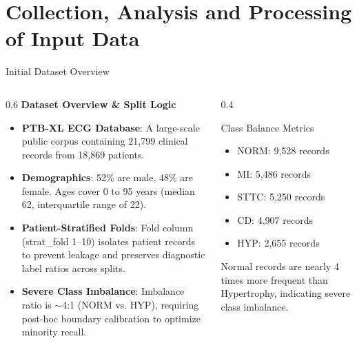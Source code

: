 \documentclass[11pt,aspectratio=169]{beamer}
\begin{document}
\section{Collection, Analysis and Processing of Input Data}
\begin{frame}{Initial Dataset Overview}
    \begin{columns}[T]
        \begin{column}{0.6\textwidth}
            \textbf{Dataset Overview \& Split Logic}
            \begin{itemize}
                \item \textbf{PTB-XL ECG Database}: A large-scale public corpus containing 21,799 clinical records from 18,869 patients.
                \item \textbf{Demographics}: 52\% are male, 48\% are female. Ages cover 0 to 95 years (median 62, interquartile range of 22).
                \item \textbf{Patient-Stratified Folds}: Fold column (strat\_fold 1--10) isolates patient records to prevent leakage and preserves diagnostic label ratios across splits.
                \item \textbf{Severe Class Imbalance}: Imbalance ratio is $\sim$4:1 (NORM vs. HYP), requiring post-hoc boundary calibration to optimize minority recall.
            \end{itemize}
        \end{column}
        \begin{column}{0.4\textwidth}
            \begin{block}{Class Balance Metrics}
                \begin{itemize}
                    \item NORM: 9,528 records
                    \item MI: 5,486 records
                    \item STTC: 5,250 records
                    \item CD: 4,907 records
                    \item HYP: 2,655 records
                \end{itemize}
                Normal records are nearly 4 times more frequent than Hypertrophy, indicating severe class imbalance.
            \end{block}
        \end{column}
    \end{columns}
\end{frame}
\end{document}
